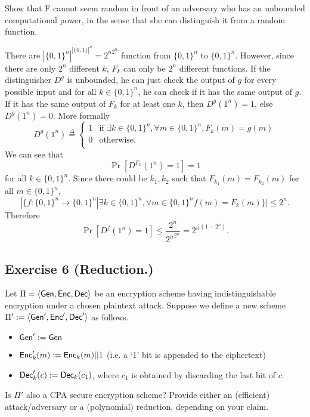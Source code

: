 Show that F cannot seem random in front of an adversary who has an unbounded computational power, 
in the sense that she can distinguish it from a random function.
\begin{solution}
  There are $|\{0,1\}^n|^{|\{0,1\}|^n} = {2^n}^{2^n}$ function from $\{0,1\}^n$ to $\{0,1\}^n$.
  However, since there are only $2^n$ different $k$, $F_k$ can only be $2^n$ different functions.
  If the distinguisher $D^g$ is unbounded, he can just check the output of $g$ for every possible input and for all $k \in \{0,1\}^n$, he can check if it has the same output of $g$.
  If it has the same output of $F_k$ for at least one $k$, then $D^g(1^n) = 1$, else $D^g(1^n) = 0$.
  More formally
  \[
    D^g(1^n) \overset{\Delta}{=} 
    \left\{ \begin{array}{rl} 
        1 & \mbox{if }\exists k \in \{0,1\}^n, \forall m \in \{0,1\}^n, F_k(m) = g(m)\\
		0 & \mbox{otherwise.}\\
    \end{array} \right.
  \]
  We can see that
  \[ \Pr[D^{F_k}(1^n) = 1] = 1 \]
  for all $k \in \{0,1\}^n$.
  Since there could be $k_1,k_2$ such that $F_{k_1}(m) = F_{k_2}(m)$ for all $m \in \{0,1\}^n$,
  \[ |\{f : \{0,1\}^n \to \{0,1\}^n | \exists k \in \{0,1\}^n, \forall m \in \{0,1\}^n f(m) = F_k(m) \}| \leq 2^n. \]
  Therefore
  \[ \Pr[D^{f}(1^n) = 1] \leq \frac{2^n}{{2^n}^{2^n}} = {2^n}^{(1-2^n)}. \]
\end{solution}


\subsection{Exercise 6 (Reduction.)}
Let $\Pi=\langle \operatorname{\mathsf{Gen}},\operatorname{\mathsf{Enc}},\operatorname{\mathsf{Dec}}\rangle$ be an encryption scheme having
indistinguishable encryption under a chosen plaintext attack. Suppose we
define a new scheme $\Pi':=\langle \operatorname{\mathsf{Gen}}',\operatorname{\mathsf{Enc}}',\operatorname{\mathsf{Dec}}'\rangle$ as follows.
\smallskip
\begin{itemize}
  \item $\operatorname{\mathsf{Gen}}':=\operatorname{\mathsf{Gen}}$
  \item $\operatorname{\mathsf{Enc}}_k'(m):=\operatorname{\mathsf{Enc}}_k(m)||1$ (i.e. a `1' bit is appended to the ciphertext)
  \item $\operatorname{\mathsf{Dec}}_k'(c):=\operatorname{\mathsf{Dec}}_k(c_1)$, where $c_1$ is obtained by discarding the last bit of $c$.
\end{itemize}
\smallskip
Is $\Pi'$ also a CPA secure encryption scheme? Provide either an (efficient) attack/adversary
or a (polynomial) reduction, depending on your claim.

